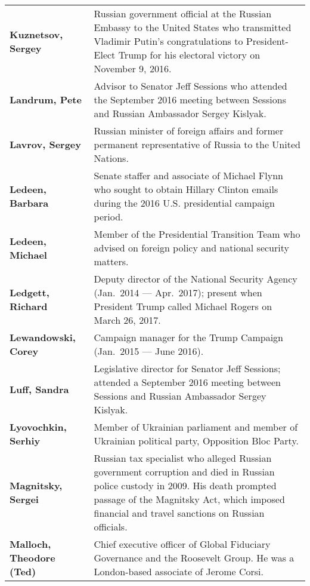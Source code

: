 \begin{longtable}{ p{} p{} }
    \textbf{Kuznetsov, Sergey} & Russian government official at the Russian Embassy to the United States who transmitted Vladimir Putin's congratulations to President-Elect Trump for his electoral victory on November 9, 2016. \\

    \textbf{Landrum, Pete} & Advisor to Senator Jeff Sessions who attended the September 2016 meeting between Sessions and Russian Ambassador Sergey Kislyak. \\

    \textbf{Lavrov, Sergey} & Russian minister of foreign affairs and former permanent representative of Russia to the United Nations. \\

    \textbf{Ledeen, Barbara} & Senate staffer and associate of Michael Flynn who sought to obtain Hillary Clinton emails during the 2016 U.S. presidential campaign period. \\

    \textbf{Ledeen, Michael} & Member of the Presidential Transition Team who advised on foreign policy and national security matters. \\

    \textbf{Ledgett, Richard} & Deputy director of the National Security Agency (Jan.~2014 — Apr.~2017); present when President Trump called Michael Rogers on March 26, 2017. \\

    \textbf{Lewandowski, Corey} & Campaign manager for the Trump Campaign (Jan.~2015 — June 2016). \\

    \textbf{Luff, Sandra} & Legislative director for Senator Jeff Sessions; attended a September 2016 meeting between Sessions and Russian Ambassador Sergey Kislyak. \\

    \textbf{Lyovochkin, Serhiy} & Member of Ukrainian parliament and member of Ukrainian political party, Opposition Bloc Party. \\

    \textbf{Magnitsky, Sergei} & Russian tax specialist who alleged Russian government corruption and died in Russian police custody in 2009. His death prompted passage of the Magnitsky Act, which imposed financial and travel sanctions on Russian officials. \\

    \textbf{Malloch, Theodore (Ted)} & Chief executive officer of Global Fiduciary Governance and the Roosevelt Group. He was a London-based associate of Jerome Corsi. \\


\end{longtable}
